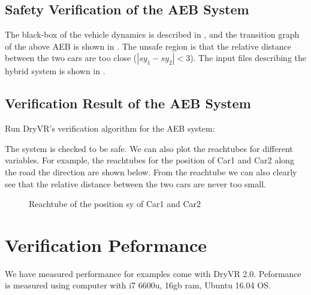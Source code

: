 \documentclass[letterpaper,10pt,english]{sphinxmanual}
\begin{document}
\subsection{Safety Verification of the AEB System}
\label{\detokenize{example:safety-verification-of-the-aeb-system}}
The black-box of the vehicle dynamics is described in , and the transition graph of the above AEB is shown in {\hyperref[\detokenize{dryvr's_language:transition-graph-label}]{}}. The unsafe region is that the relative distance between the two cars are too close (\(|sy_1-sy_2|<3\)). The input files describing the hybrid system is shown in {\hyperref[\detokenize{dryvr's_language:input-format-label}]{}}.


\subsection{Verification Result of the AEB System}
\label{\detokenize{example:verification-result-of-the-aeb-system}}
Run DryVR's verification algorithm for the AEB system:

\begin{sphinxVerbatim}[commandchars=\\\{\}]
  
\end{sphinxVerbatim}

The system is checked to be safe. We can also plot the reachtubes for different variables. For example, the reachtubes for the position of Car1 and Car2 along the road the direction are shown below. From the reachtube we can also clearly see that the relative distance between the two cars are never too small.
\begin{figure}[htbp]
\centering
\capstart

\noindent{}
\caption{Reachtube of the position sy of Car1 and Car2}\label{\detokenize{example:id2}}\end{figure}


\section{Verification Peformance}
\label{\detokenize{example:verification-peformance}}
We have measured performance for examples come with DryVR 2.0.
Peformance is measured using computer with i7 6600u, 16gb ram, Ubuntu 16.04 OS.
\end{document}
